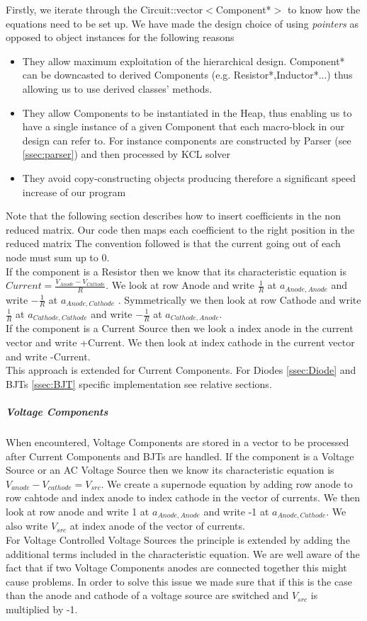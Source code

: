 \documentclass{article}
\begin{document}
Firstly, we iterate through the Circuit::vector$<$Component*$>$ to know how the equations need to be set up. We have made the design choice of using \textit{pointers} as opposed to object instances for the following reasons
\begin{itemize}
  \item They allow maximum exploitation of the hierarchical design. Component* can be downcasted to derived Components (e.g. Resistor*,Inductor*...) thus allowing us to use derived classes' methods.
  \item They allow Components to be instantiated in the Heap, thus enabling us to have a single instance of a given Component that each macro-block in our design can refer to. For instance components are constructed by Parser (see \ref{ssec:parser}) and then processed by KCL solver
  \item They avoid copy-constructing objects producing therefore a significant speed increase of our program
\end{itemize}

Note that the following section describes how to insert coefficients in the non reduced matrix. Our code then maps each coefficient to the right position in the reduced matrix\bigbreak
The convention followed is that the current going out of each node must sum up to 0.\\
If the component is a Resistor then we know that its characteristic equation is $Current = \frac{V_{Anode} - V_{Cathode}}{R}$. We look at row Anode and write $\frac{1}{R}$ at $a_{Anode,Anode}$  and write $-\frac{1}{R}$ at $a_{Anode,Cathode}$ . Symmetrically we then look at row Cathode and write $\frac{1}{R}$ at $a_{Cathode,Cathode}$  and write $-\frac{1}{R}$ at $a_{Cathode,Anode}$.\\
If the component is a Current Source then we look a index anode in the current vector and write +Current. We then look at index cathode in the current vector and write -Current.\\
This approach is extended for Current Components. For Diodes \ref{ssec:Diode} and BJTs \ref{ssec:BJT} specific implementation see relative sections.

\subparagraph{Voltage Components}
When encountered, Voltage Components are stored in a vector to be processed after Current Components and BJTs are handled.\bigbreak
If the component is a Voltage Source or an AC Voltage Source then we know its characteristic equation is $V_{anode}-V_{cathode}=V_{src}$. We create a supernode equation by adding row anode to row cahtode and index anode to index cathode in the vector of currents. We then look at row anode and write 1 at $a_{Anode,Anode}$ and write -1 at $a_{Anode,Cathode}$. We also write $V_{src}$ at index anode of the vector of currents.\\ For Voltage Controlled Voltage Sources the principle is extended by adding the additional terms included in the characteristic equation.\bigbreak
We are well aware of the fact that if two Voltage Components anodes are connected together this might cause problems. In order to solve this issue we made sure that if this is the case than the anode and cathode of a voltage source are switched and $V_{src}$ is multiplied by -1.
\end{document}
